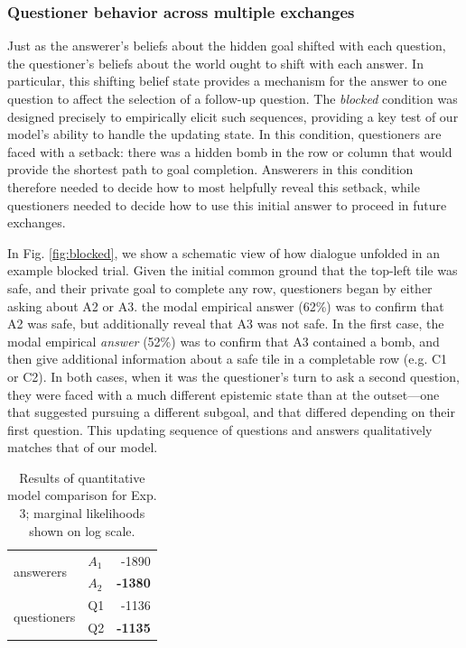 \documentclass[11pt, floatsintext]{apa6}
\begin{document}
\subsubsection{Questioner behavior across multiple exchanges}

Just as the answerer's beliefs about the hidden goal shifted with each question, the questioner's beliefs about the world ought to shift with each answer. 
In particular, this shifting belief state provides a mechanism for the answer to one question to affect the selection of a follow-up question.
The \emph{blocked} condition was designed precisely to empirically elicit such sequences, providing a key test of our model's ability to handle the updating state.
In this condition, questioners are faced with a setback: there was a hidden bomb in the row or column that would provide the shortest path to goal completion.
Answerers in this condition therefore needed to decide how to most helpfully reveal this setback, while questioners needed to decide how to use this initial answer to proceed in future exchanges.

In Fig. \ref{fig:blocked}, we show a schematic view of how dialogue unfolded in an example blocked trial.
Given the initial common ground that the top-left tile was safe, and their private goal to complete any row, questioners began by either asking about A2 or A3.
the modal empirical answer (62\%) was to confirm that A2 was safe, but additionally reveal that A3 was not safe.
In the first case, the modal empirical \emph{answer} (52\%) was to confirm that A3 contained a bomb, and then give additional information about a safe tile in a completable row (e.g. C1 or C2).  
In both cases, when it was the questioner's turn to ask a second question, they were faced with a much different epistemic state than at the outset---one that suggested pursuing a different subgoal, and that differed depending on their first question. 
This updating sequence of questions and answers qualitatively matches that of our model.

\begin{table}[]
\begin{center}
\begin{tabular}{@{}llr@{}}
\toprule
\multirow{2}{*}{answerers} & $A_1$ & -1890 \\ \cmidrule(l){2-3} 
 & $A_2$ & \textbf{-1380} \\ \midrule
\multirow{2}{*}{questioners} & Q1 & -1136  \\ \cmidrule(l){2-3} 
 & Q2 & \textbf{-1135} \\ \bottomrule
\end{tabular}
\end{center}
\caption{Results of quantitative model comparison for Exp. 3; marginal likelihoods shown on log scale.}
\label{table:exp3likelihoods}
\end{table}
\end{document}
